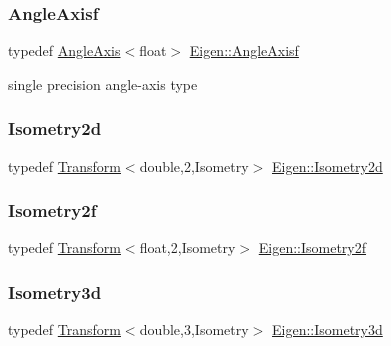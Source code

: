 \subsubsection{\texorpdfstring{AngleAxisf}{AngleAxisf}}
{\footnotesize\ttfamily typedef \mbox{\hyperlink{class_eigen_1_1_angle_axis}{Angle\+Axis}}$<$float$>$ \mbox{\hyperlink{group___geometry___module_gad823b9c674644b14d950fbfe165dfdbf}{Eigen\+::\+Angle\+Axisf}}}

single precision angle-\/axis type \mbox{\label{group___geometry___module_ga517183233a93969160a02b10d0a898f1}} 
\subsubsection{\texorpdfstring{Isometry2d}{Isometry2d}}
{\footnotesize\ttfamily typedef \mbox{\hyperlink{class_eigen_1_1_transform}{Transform}}$<$double,2,Isometry$>$ \mbox{\hyperlink{group___geometry___module_ga517183233a93969160a02b10d0a898f1}{Eigen\+::\+Isometry2d}}}

\mbox{\label{group___geometry___module_ga8262f9f26bd97dbb1688a10ca323e534}} 
\subsubsection{\texorpdfstring{Isometry2f}{Isometry2f}}
{\footnotesize\ttfamily typedef \mbox{\hyperlink{class_eigen_1_1_transform}{Transform}}$<$float,2,Isometry$>$ \mbox{\hyperlink{group___geometry___module_ga8262f9f26bd97dbb1688a10ca323e534}{Eigen\+::\+Isometry2f}}}

\mbox{\label{group___geometry___module_ga5a91dba9c396daa1eb0a4d08566c4e9e}} 
\subsubsection{\texorpdfstring{Isometry3d}{Isometry3d}}
{\footnotesize\ttfamily typedef \mbox{\hyperlink{class_eigen_1_1_transform}{Transform}}$<$double,3,Isometry$>$ \mbox{\hyperlink{group___geometry___module_ga5a91dba9c396daa1eb0a4d08566c4e9e}{Eigen\+::\+Isometry3d}}}

